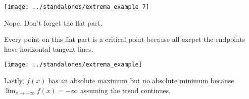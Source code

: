 \documentclass[12pt]{beamer}
\begin{document}
\begin{frame}[t]
  \texttt{[image: ../standalones/extrema\_example\_7]}
  
  Nope. Don't forget the flat part. 

  Every point on this flat part is a critical point because all excpet the endpoints have horizontal tangent lines.
\end{frame}


\begin{frame}[t]
  \texttt{[image: ../standalones/extrema\_example]}

  Lastly, \(f(x)\) has an absolute maximum but no absolute minimum because \(\lim_{x \to -\infty} f(x) = -\infty\) assuming the trend continues.
\end{frame}
\end{document}
